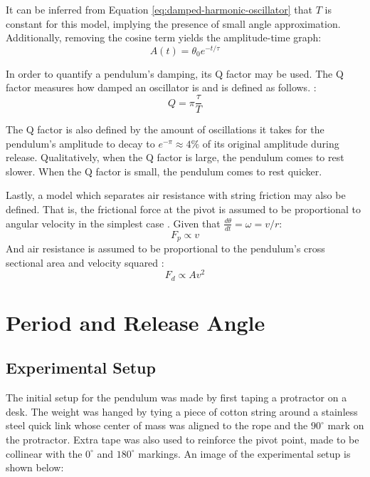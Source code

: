 \documentclass[11pt]{article}
\begin{document}
\begin{multicols}{2}
It can be inferred from Equation \ref{eq:damped-harmonic-oscillator} that $T$ is constant for this model, implying the presence of small angle approximation. Additionally, removing the cosine term yields the amplitude-time graph:
\begin{equation} \label{eq:amplitude-function}
    A(t) = \theta_0 e^{-{t/\tau}}
\end{equation}

In order to quantify a pendulum's damping, its Q factor may be used. The Q factor measures how damped an oscillator is and is defined as follows. \cite{pnp-physics}:
\begin{equation} \label{eq:q-factor-formula}
    Q = \pi\frac{\tau}{T}
\end{equation}

The Q factor is also defined by the amount of oscillations it takes for the pendulum's amplitude to decay to $e^{-\pi} \approx 4\%$ of its original amplitude during release. Qualitatively, when the Q factor is large, the pendulum comes to rest slower. When the Q factor is small, the pendulum comes to rest quicker.

Lastly, a model which separates air resistance with string friction may also be defined. That is, the frictional force at the pivot is assumed to be proportional to angular velocity in the simplest case \cite{duke-pendulum}. Given that $\frac{d\theta}{dt} = \omega = v/r$:
\begin{equation} \label{eq:propto v}
    F_p \propto v
\end{equation}
And air resistance is assumed to be proportional to the pendulum's cross sectional area and velocity squared \cite{airdrag}:
\begin{equation} \label{eq:propto v2}
    F_d \propto Av^2
\end{equation}

\section{Period and Release Angle} \label{sec 3 period and release angle}

\subsection{Experimental Setup}
The initial setup for the pendulum was made by first taping a protractor on a desk. The weight was hanged by tying a piece of cotton string around a stainless steel quick link whose center of mass was aligned to the rope and the $90^{\circ}$ mark on the protractor. Extra tape was also used to reinforce the pivot point, made to be collinear with the $0^{\circ}$ and $180^{\circ}$ markings. An image of the experimental setup is shown below:


\end{multicols}
\end{document}
